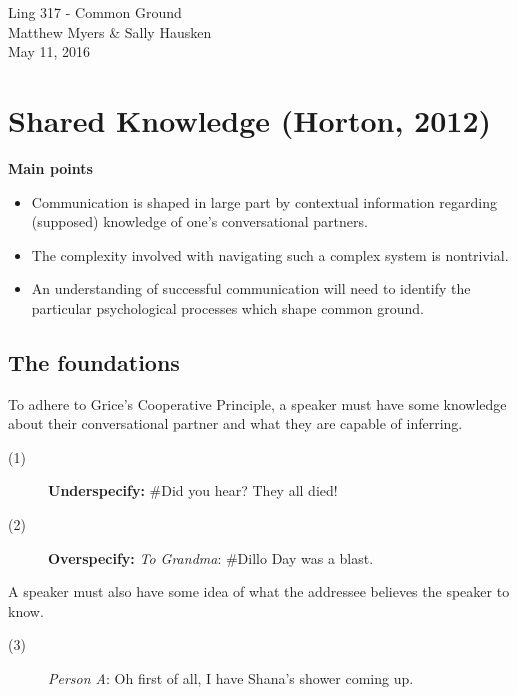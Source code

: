 \documentclass{article}
\begin{document}
\begin{multicols}{2}
	\begin{center}
		{\LARGE Ling 317 - Common Ground}\\\vspace{3mm}
		{\large Matthew Myers \& Sally Hausken\\\vspace{1.5mm}
		May 11, 2016}
	\end{center}
\tableofcontents
\section{Shared Knowledge (Horton, 2012)}
	\textbf{Main points}
	\begin{itemize}
		\item Communication is shaped in large part by contextual information regarding (supposed) knowledge of one's conversational partners.
		\item The complexity involved with navigating such a complex system is nontrivial.
		\item An understanding of successful communication will need to identify the particular psychological processes which shape common ground.  
	\end{itemize}
\subsection{The foundations}
To adhere to Grice's Cooperative Principle, a speaker must have some knowledge about their conversational partner and what they are capable of inferring.\\\vspace{-4mm}
\begin{description}
	\item[(1)] \textbf{Underspecify:} \#Did you hear? They all died! \vspace{-2mm}
	\item[(2)] \textbf{Overspecify:} \textit{To Grandma}: \#Dillo Day was a blast.
\end{description}
A speaker must also have some idea of what the addressee believes the speaker to know.

\begin{description}
	\item[(3)] \textit{Person A}: Oh first of all, I have Shana's shower coming up.\\\vspace{-5.0mm}
	

\end{description}
\end{multicols}
\end{document}
